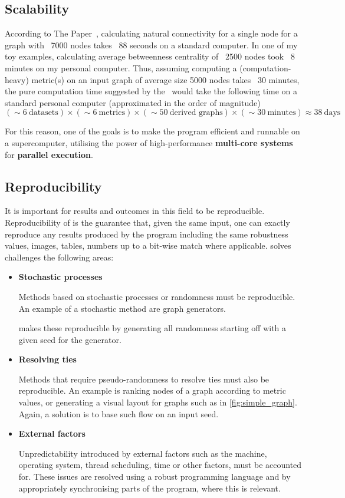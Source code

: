 \subsection{Scalability}

According to The Paper~\cite{Bozhilova2019}, calculating natural connectivity for a single node for a graph with ~7000 nodes takes ~88 seconds on a standard computer.
In one of my toy examples, calculating average betweenness centrality of ~2500 nodes took ~8 minutes on my personal computer.
Thus, assuming computing a (computation-heavy) metric(s) on an input graph of average size 5000 nodes takes ~30 minutes, the pure computation time suggested by the~ would take the following time on a standard personal computer (approximated in the order of magnitude)
\[(\sim 6\ \text{datasets}) \times (\sim 6\ \text{metrics}) \times (\sim 50\ \text{derived graphs}) \times (\sim 30\ \text{minutes}) \approx 38\ \text{days}\]

For this reason, one of the goals is to make the program efficient and runnable on a supercomputer, utilising the power of high-performance \textbf{multi-core systems} for \textbf{parallel execution}.

\subsection{Reproducibility}\label{sec:reproducibility}

It is important for results and outcomes in this field to be reproducible.
Reproducibility of \graffs is the guarantee that, given the same input, one can exactly reproduce any results produced by the program including the same robustness values, images, tables, numbers up to a bit-wise match where applicable.
\graffs solves challenges the following areas:
\begin{itemize}
    \item \textbf{Stochastic processes}

    Methods based on stochastic processes or randomness must be reproducible.
    An example of a stochastic method are graph generators.

    \graffs makes these reproducible by generating all randomness starting off with a given seed for the generator.

    \item \textbf{Resolving ties}

    Methods that require pseudo-randomness to resolve ties must also be reproducible.
    An example is ranking nodes of a graph according to metric values, or generating a visual layout for graphs such as in \autoref{fig:simple_graph}.
    Again, a solution is to base such flow on an input seed.

    \item \textbf{External factors}

    Unpredictability introduced by external factors such as the machine, operating system, thread scheduling, time or other factors, must be accounted for.
    These issues are resolved using a robust programming language and by appropriately synchronising parts of the program, where this is relevant.
\end{itemize}

